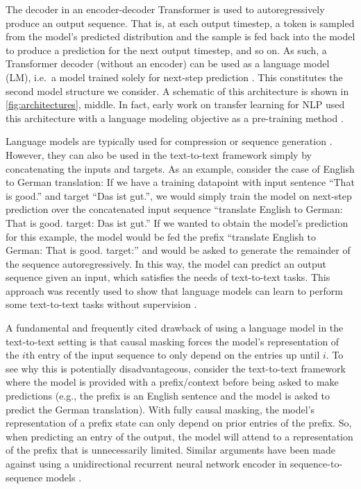 \documentclass[twoside,11pt]{article}
\begin{document}
The decoder in an encoder-decoder Transformer is used to autoregressively produce an output sequence.
That is, at each output timestep, a token is sampled from the model's predicted distribution and the sample is fed back into the model to produce a prediction for the next output timestep, and so on.
As such, a Transformer decoder (without an encoder) can be used as a language model (LM), i.e.\ a model trained solely for next-step prediction \citep{liu2018generating,radford2018improving,al2019character}.
This constitutes the second model structure we consider.
A schematic of this architecture is shown in \cref{fig:architectures}, middle.
In fact, early work on transfer learning for NLP used this architecture with a language modeling objective as a pre-training method \citep{radford2018improving}.

Language models are typically used for compression or sequence generation \citep{graves2013generating}.
However, they can also be used in the text-to-text framework simply by concatenating the inputs and targets.
As an example, consider the case of English to German translation: If we have a training datapoint with input sentence ``That is good.'' and target ``Das ist gut.'', we would simply train the model on next-step prediction over the concatenated input sequence ``translate English to German: That is good. target: Das ist gut.''
If we wanted to obtain the model's prediction for this example, the model would be fed the prefix ``translate English to German: That is good. target:'' and would be asked to generate the remainder of the sequence autoregressively.
In this way, the model can predict an output sequence given an input, which satisfies the needs of text-to-text tasks.
This approach was recently used to show that language models can learn to perform some text-to-text tasks without supervision \citep{radford2019language}.

A fundamental and frequently cited drawback of using a language model in the text-to-text setting is that causal masking forces the model's representation of the $i$th entry of the input sequence to only depend on the entries up until $i$.
To see why this is potentially disadvantageous, consider the text-to-text framework where the model is provided with a prefix/context before being asked to make predictions (e.g., the prefix is an English sentence and the model is asked to predict the German translation).
With fully causal masking, the model's representation of a prefix state can only depend on prior entries of the prefix.
So, when predicting an entry of the output, the model will attend to a representation of the prefix that is unnecessarily limited.
Similar arguments have been made against using a unidirectional recurrent neural network encoder in sequence-to-sequence models \citep{bahdanau2014neural}.
\end{document}
